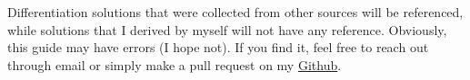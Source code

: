 Differentiation solutions that were collected from other sources will be referenced, while solutions that I derived by myself will not have any reference. Obviously, this guide may have errors (I hope not). If you find it, feel free to reach out through email or simply make a pull request on my \href{https://github.com/tapyu/tapyu.github.io/tree/master/notes/posts/matrix_diff_ref/latex}{Github}.